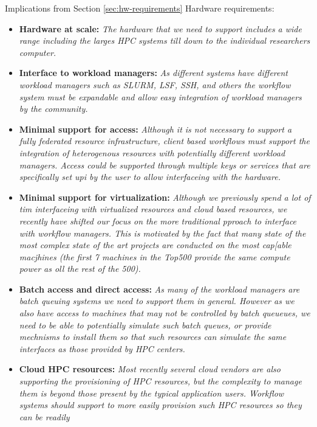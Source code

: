 \documentclass[utf8]{FrontiersinVancouver} %
\begin{document}
\begin{tcolorbox}[breakable]
Implications from Section \ref{sec:hw-requirements} Hardware requirements:

\begin{itemize}
\item {\bf Hardware at scale:} {\it The hardware that we need to
    support includes a wide range including the larges HPC systems
    till down to the individual researchers computer.}
\item {\bf Interface to workload managers:} {\it As different systems
    have different workload managers such as SLURM, LSF, SSH, and
    others the workflow system must be expandable and allow easy
    integration of workload managers by the community.}  
\item {\bf Minimal support for access:} {\it Although it is not
    necessary to support a fully federated resource infrastructure,
    client based workflows must support the integration of
    heterogenous resources with potentially different workload
    managers. Access could be supported through multiple keys or
    services that are specifically set upi by the user to allow
    interfaceing with the hardware.}
\item {\bf Minimal support for virtualization:} {\it Although we
    previously spend a lot of tim interfaceing with virtualized
    resources and cloud based resources, we recently have shifted our
    focus on the more traditional pproach to interface with workflow
    managers. This is motivated by the fact that many state of the
    most complex state of the art projects are conducted on the most
    cap[able macjhines (the first 7 machines in the Top500 provide the
    same compute power as oll the rest of the 500).}
\item {\bf Batch access and direct access:} {\it As many of the
    workload managers are batch queuing systems we need to support
    them in general. However as we also have access to machines that
    may not be controlled by batch queueues, we need to be able to
    potentially simulate such batch queues, or provide mechnisms to
    install them so that such resources can simulate the same
    interfaces as those provided by HPC centers.}
 \item {\bf Cloud HPC resources:} {\it Most recently several cloud
     vendors are also supporting the provisioning of HPC resources,
     but the complexity to manage them is beyond those present by the
     typical application users. Workflow systems should support to
     more easily provision such HPC resources so they can be readily
}
\end{itemize}
\end{tcolorbox}
\end{document}
